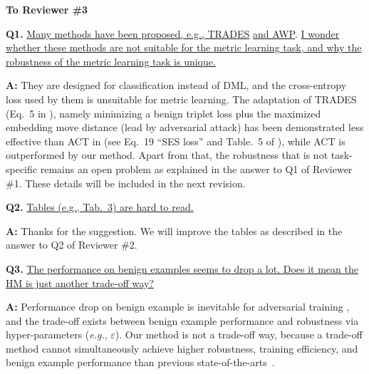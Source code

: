 \documentclass[10pt,twocolumn,letterpaper]{article}
\begin{document}
\vspace{0.3em}
\noindent\textbf{To Reviewer \#3}
\vspace{0.3em}

\noindent\textbf{Q1.}
%
\ul{Many methods have been proposed, e.g., TRADES}\cite{trades} \ul{and
AWP}\cite{awp}.  \ul{I wonder whether these methods are not suitable for the
metric learning task, and why the robustness of the metric learning task is
unique.}

\noindent\textbf{A:}
%
They are designed for classification instead of DML, and the cross-entropy loss
used by them is unsuitable for metric learning.
%
The adaptation of TRADES (Eq.~5 in \cite{trades}), namely minimizing a benign
triplet loss plus the maximized embedding move distance (lead by adversarial
attack) has been demonstrated less effective than ACT in \cite{robrank} (see
Eq.~19 ``SES loss'' and Table.~5 of \cite{robrank}), while ACT is outperformed
by our method.
%
Apart from that, the robustness that is not task-specific remains an open
problem as explained in the answer to Q1 of Reviewer \#1.
%
These details will be included in the next revision.


\noindent\textbf{Q2.}
%
\ul{Tables (e.g., Tab.~3) are hard to read.}

\noindent\textbf{A:} Thanks for the suggestion. We will improve the tables as described in the answer to Q2 of Reviewer \#2.

\noindent\textbf{Q3.}
%
\ul{The performance on benign examples seems to drop a lot. Does it mean the
HM is just another trade-off way?}

\noindent\textbf{A:}
%
Performance drop on benign example is inevitable for adversarial training
\cite{madry,trades,awp,advrank,robrank}, and the trade-off exists
between benign example performance and robustness via hyper-parameters
(\emph{e.g.}, $\varepsilon$).
%
Our method is not a trade-off way, because a trade-off method cannot
simultaneously achieve higher robustness, training efficiency, and benign
example performance than previous state-of-the-arts~\cite{advrank,robrank}.

{\small


}
\end{document}
